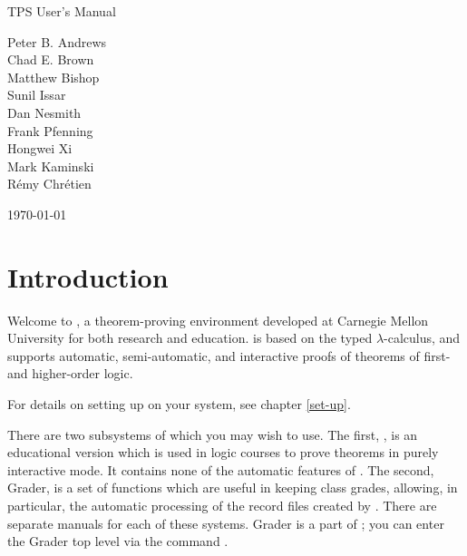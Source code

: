 \documentclass[10pt,twoside]{book}
\begin{document}
\frontmatter                           %


\begin{titlepage}
\begin{center}
{\bf

\vspace{1.00in}
{\Large TPS User's Manual}

\vspace{0.50in}


Peter B. Andrews\\
Chad E. Brown\\
Matthew Bishop\\
Sunil Issar\\
Dan Nesmith\\
Frank Pfenning\\
Hongwei Xi\\
Mark Kaminski\\
R\'{e}my Chr\'{e}tien\\
\vspace{0.50in}

\today 
}
\end{center}

\vspace{3.20in}



\end{titlepage}

\tableofcontents

\mainmatter\pagestyle{headings}         %

\chapter{Introduction}

Welcome to {\TPS}, a theorem-proving environment developed at
Carnegie Mellon University for
both research and education.  {\TPS} is based on the typed
$\lambda$-calculus, and supports automatic, semi-automatic, and
interactive proofs of theorems of first- and higher-order logic.

For details on setting {\TPS} up on your system, see chapter \ref{set-up}.

There are two subsystems of {\TPS} which you may wish to use.  The
first, {\ETPS}, is an educational version which is used in logic courses
to prove theorems in purely interactive mode.  It contains none of the
automatic features of {\TPS}.  The second, Grader, is a set of functions
which are useful in keeping class grades, allowing, in particular, the
automatic processing of the record files created by {\ETPS}.  There are
separate manuals for each of these systems.  Grader is a part of {\TPS};
you can enter the Grader top level via the command
.
\end{document}
